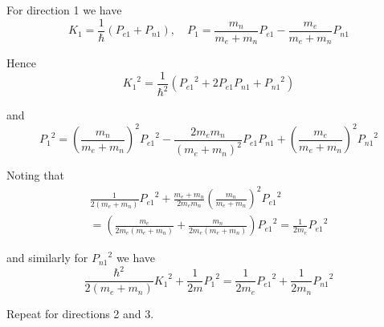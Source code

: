 


\bigskip
For direction 1 we have
\begin{equation*}
K_1=\frac{1}{\hbar}(P_{e1}+P_{n1}),\quad
P_1=\frac{m_n}{m_e+m_n}P_{e1}-\frac{m_e}{m_e+m_n}P_{n1}
\end{equation*}

Hence
\begin{equation*}
{K_1}^2=\frac{1}{\hbar^2}\left({P_{e1}}^2+2P_{e1}P_{n1}+{P_{n1}}^2\right)
\end{equation*}

and
\begin{equation*}
{P_1}^2=\left(\frac{m_n}{m_e+m_n}\right)^2{P_{e1}}^2
-\frac{2m_em_n}{(m_e+m_n)^2}P_{e1}P_{n1}
+\left(\frac{m_e}{m_e+m_n}\right)^2{P_{n1}}^2
\end{equation*}

Noting that
\begin{multline*}
\frac{1}{2(m_e+m_n)}{P_{e1}}^2+\frac{m_e+m_n}{2m_em_n}\left(\frac{m_n}{m_e+m_n}\right)^2{P_{e1}}^2
\\
=\left(\frac{m_e}{2m_e(m_e+m_n)}+\frac{m_n}{2m_e(m_e+m_n)}\right){P_{e1}}^2
=\frac{1}{2m_e}{P_{e1}}^2
\end{multline*}

and similarly for ${P_{n1}}^2$ we have
\begin{equation*}
\frac{\hbar^2}{2(m_e+m_n)}{K_1}^2+\frac{1}{2m}{P_1}^2
=\frac{1}{2m_e}{P_{e1}}^2+\frac{1}{2m_n}{P_{n1}}^2
\end{equation*}

Repeat for directions 2 and 3.


